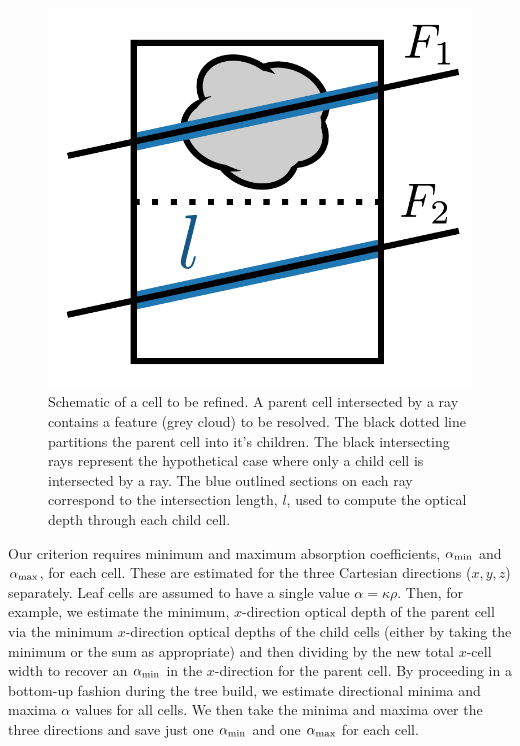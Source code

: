 \documentclass[fleq,usenatbib]{mnras}
\begin{document}
{\begin{figure}
\includegraphics[width=1\linewidth]{Figures/refine.pdf}
\caption{Schematic of a cell to be refined. A parent cell intersected by a ray 
contains a feature (grey cloud) to be resolved. The black dotted line 
partitions the parent cell into it's children. The black intersecting rays 
represent the hypothetical case where only a child cell is intersected by a 
ray. The blue outlined sections on each ray correspond to the intersection 
length, $l$,  used to compute the optical depth through each child cell.}
\label{fig:refine}
\end{figure}
Our criterion requires minimum and maximum 
absorption coefficients, $\alpha_{\rm min}$ and $\alpha_{\rm max}$, for each cell.
These are estimated for the three Cartesian directions ($x,y,z$) separately.
Leaf cells are assumed to have a single value $\alpha = \kappa \rho$.
Then, for example,
we estimate the minimum, $x$-direction optical depth of the parent cell via
the minimum $x$-direction optical depths of the child cells
(either by taking the minimum or the sum as appropriate) and then dividing by
the new total $x$-cell width to recover an $\alpha_{\rm min}$ in the $x$-direction for the
parent cell.  By proceeding in a bottom-up fashion
during the tree build, we estimate directional minima and maxima $\alpha$ values for all cells.
We then take the minima and maxima
over the three directions and save just one $\alpha_{\rm min}$ and one $\alpha_{\rm max}$
for each cell.

}
\end{document}
